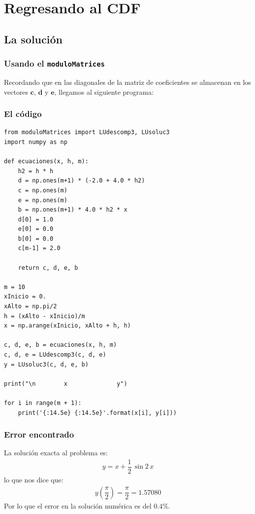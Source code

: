 \documentclass[12pt]{beamer}
\begin{document}
\section{Regresando al CDF}
\subsection{La solución}

\begin{frame}
\frametitle{Usando el \texttt{moduloMatrices}}
Recordando que en  las diagonales de la matriz de coeficientes se almacenan en los vectores $\mathbf{c}$, $\mathbf{d}$ y $\mathbf{e}$, llegamos al siguiente programa:
\end{frame}
\begin{frame}
\frametitle{El código}
\begin{lstlisting}[caption=Solución al problema de CDF]
from moduloMatrices import LUdescomp3, LUsoluc3
import numpy as np

def ecuaciones(x, h, m):
    h2 = h * h
    d = np.ones(m+1) * (-2.0 + 4.0 * h2)
    c = np.ones(m)
    e = np.ones(m)
    b = np.ones(m+1) * 4.0 * h2 * x
    d[0] = 1.0
    e[0] = 0.0
    b[0] = 0.0
    c[m-1] = 2.0
    
    return c, d, e, b

m = 10
xInicio = 0.
xAlto = np.pi/2
h = (xAlto - xInicio)/m
x = np.arange(xInicio, xAlto + h, h)

c, d, e, b = ecuaciones(x, h, m)
c, d, e = LUdescomp3(c, d, e)
y = LUsoluc3(c, d, e, b)

print("\n        x              y")

for i in range(m + 1):
    print('{:14.5e} {:14.5e}'.format(x[i], y[i]))
\end{lstlisting}
\end{frame}
\begin{frame}
\frametitle{Error encontrado}
La solución exacta al problema es:
\pause
\begin{align*}
y = x + \dfrac{1}{2} \, \sin 2 \, x
\end{align*}
lo que nos dice que:
\begin{align*}
y \left( \dfrac{\pi}{2} \right) = \dfrac{\pi}{2} = 1.57080
\end{align*}
\pause
Por lo que el error en la solución numérica es del $0.4\%$.
\end{frame}
\end{document}
